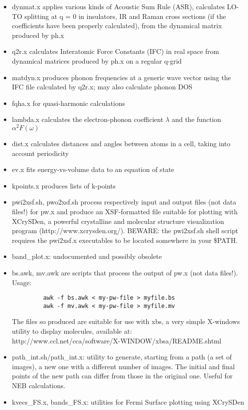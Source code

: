 \documentclass[12pt,a4paper]{article}
\begin{document}
\begin{itemize}
\item dynmat.x applies various kinds of Acoustic Sum Rule (ASR),
  calculates LO-TO splitting at q = 0 in insulators, IR and Raman
  cross sections (if the coefficients have been properly calculated),
  from the dynamical matrix produced by ph.x 
\item q2r.x calculates Interatomic Force Constants (IFC) in real space
  from dynamical matrices produced by ph.x on a regular q-grid 
\item  matdyn.x produces phonon frequencies at a generic wave vector
  using the IFC ﬁle calculated by q2r.x; may also calculate phonon DOS 
\item fqha.x for quasi-harmonic calculations 
\item lambda.x calculates the electron-phonon coefficient $\lambda$ and the
  function $\alpha^2F(\omega)$ 
\item dist.x calculates distances and angles between atoms in a cell,
  taking into account periodicity 
\item ev.x fits energy-vs-volume data to an equation of state
\item kpoints.x produces lists of k-points
\item pwi2xsf.sh, pwo2xsf.sh process respectively input and output
  files (not data files!) for pw.x and produce an XSF-formatted file
  suitable for plotting with XCrySDen, a powerful crystalline and
  molecular structure visualization program
  (http://www.xcrysden.org/). BEWARE: the pwi2xsf.sh shell script
  requires the pwi2xsf.x executables to be located somewhere in your
  \$PATH. 
\item band\_plot.x: undocumented and possibly obsolete 
\item bs.awk, mv.awk are scripts that process the output of pw.x (not
data files!). Usage: 
\begin{verbatim}
         awk -f bs.awk < my-pw-file > myfile.bs
         awk -f mv.awk < my-pw-file > myfile.mv
\end{verbatim}
The files so produced are suitable for use with xbs, a very simple
X-windows utility to display molecules, available at:\\
http://www.ccl.net/cca/software/X-WINDOW/xbsa/README.shtml 
\item path\_int.sh/path\_int.x: utility to generate, starting from a
  path (a set of images), a new one with a different number of
  images. The initial and ﬁnal points of the new path can diﬀer from
  those in the original one. Useful for NEB calculations. 
\item kvecs\_FS.x, bands\_FS.x: utilities for Fermi Surface plotting
  using XCrySDen
\end{itemize}
\end{document}
